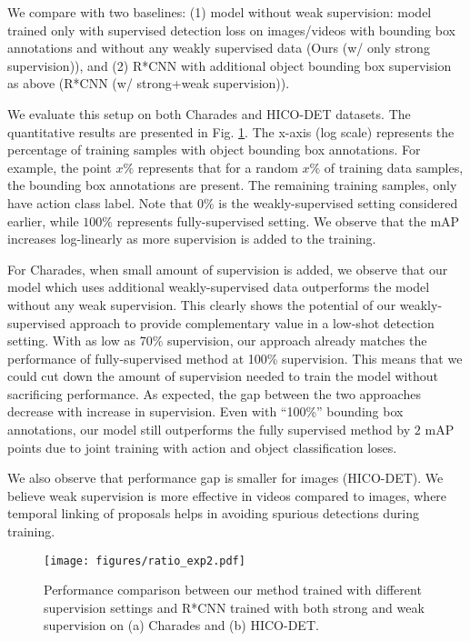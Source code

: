 \documentclass[10pt,twocolumn,letterpaper]{article}
\begin{document}
We compare with two baselines: (1) model without weak supervision: model trained only with supervised detection loss on images/videos with bounding box annotations and without any weakly supervised data (Ours (w/ only strong supervision)),  and (2) R*CNN \cite{gkioxari2015contextual} with additional object bounding box supervision as above (R*CNN (w/ strong+weak supervision)).

We evaluate this setup on both Charades and HICO-DET datasets. The quantitative results are presented in Fig. \ref{fig:semi-supervision}. The x-axis (log scale) represents the percentage of training samples with object bounding box annotations. For example, the point $x\%$ represents that for a random $x\%$ of training data samples, the bounding box annotations are present. The remaining training samples, only have action class label. Note that $0\%$ is the weakly-supervised setting considered earlier, while $100\%$ represents fully-supervised setting. We observe that the mAP increases log-linearly as more supervision is added to the training.



For Charades, when small amount of supervision is added, we observe that our model which uses additional weakly-supervised data outperforms the model without any weak supervision. This clearly shows the potential of our weakly-supervised approach to provide complementary value in a low-shot detection setting. With as low as 70\% supervision, our approach already matches the performance of fully-supervised method at 100\% supervision. This means that we could cut down the amount of supervision needed to train the model without sacrificing performance. As expected, the gap between the two approaches decrease with increase in supervision. Even with ``100\%'' bounding box annotations, our model still outperforms the fully supervised method by $2$ mAP points due to joint training with action and object classification loses.

We also observe that performance gap is smaller for images (HICO-DET). We believe weak supervision is more effective in videos compared to images, where temporal linking of proposals helps in avoiding spurious detections during training.

\begin{figure}
\centering
\texttt{[image: figures/ratio\_exp2.pdf]}
\caption{Performance comparison between our method trained with different supervision settings and R*CNN trained with both strong and weak supervision on (a) Charades and (b) HICO-DET.}
\label{fig:semi-supervision}
\vspace{-1.3\baselineskip}
\end{figure}
 \vspace{-0.6\baselineskip}
\end{document}
